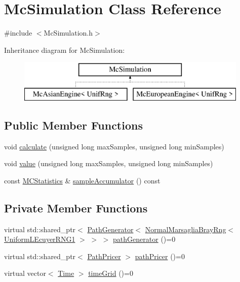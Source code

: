 \hypertarget{class_mc_simulation}{}\section{Mc\+Simulation Class Reference}
\label{class_mc_simulation}


{\ttfamily \#include $<$Mc\+Simulation.\+h$>$}

Inheritance diagram for Mc\+Simulation\+:\begin{figure}[H]
\begin{center}
\leavevmode
\includegraphics[height=2.000000cm]{class_mc_simulation}
\end{center}
\end{figure}
\subsection*{Public Member Functions}
\begin{DoxyCompactItemize}
\item 
void \hyperlink{class_mc_simulation_a34949008df3c2b7fd4df32fac3875582}{calculate} (unsigned long max\+Samples, unsigned long min\+Samples)
\item 
void \hyperlink{class_mc_simulation_a5f74044189f64941f7fd3aaa4acc8e8e}{value} (unsigned long max\+Samples, unsigned long min\+Samples)
\item 
const \hyperlink{class_m_c_statistics}{M\+C\+Statistics} \& \hyperlink{class_mc_simulation_af66197576bd23e26e91636f8ca1c7197}{sample\+Accumulator} () const
\end{DoxyCompactItemize}
\subsection*{Private Member Functions}
\begin{DoxyCompactItemize}
\item 
virtual std\+::shared\+\_\+ptr$<$ \hyperlink{class_path_generator}{Path\+Generator}$<$ \hyperlink{class_normal_marsaglia_bray_rng}{Normal\+Marsaglia\+Bray\+Rng}$<$ \hyperlink{class_uniform_l_ecuyer_r_n_g1}{Uniform\+L\+Ecuyer\+R\+N\+G1} $>$ $>$ $>$ \hyperlink{class_mc_simulation_ada27dc346c81cf3d7aff84188dd12381}{path\+Generator} ()=0
\item 
virtual std\+::shared\+\_\+ptr$<$ \hyperlink{class_path_pricer}{Path\+Pricer} $>$ \hyperlink{class_mc_simulation_a3182a27c79d31cfb65e9a1a6b60f5391}{path\+Pricer} ()=0
\item 
virtual vector$<$ \hyperlink{_name_def_8h_ac2d3e0ba793497bcca555c7c2cf64ff3}{Time} $>$ \hyperlink{class_mc_simulation_a71f4b6eedd90f057203a94467a691387}{time\+Grid} ()=0
\end{DoxyCompactItemize}
